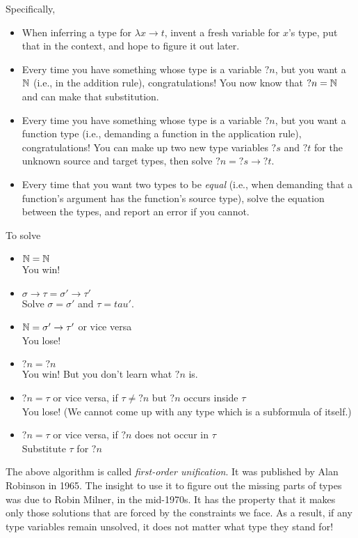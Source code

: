 \documentclass{article}
\begin{document}
Specifically,
\begin{itemize}
\item When inferring a type for $\lambda x\to t$, invent a fresh
  variable for $x$'s type, put that in the context, and hope to
  figure it out later.
\item Every time you have something whose type is a variable $?n$,
  but you want a $\mathbb{N}$ (i.e., in the addition rule), congratulations! You now know that
  $?n=\mathbb{N}$ and can make that substitution.
\item Every time you have something whose type is a variable $?n$,
  but you want a function type (i.e., demanding a function in the application rule), congratulations! You can make up
  two new type variables $?s$ and $?t$ for the unknown source and target
  types, then solve $?n=?s\to?t$.
\item Every time that you want two types to be \emph{equal} (i.e., when demanding
  that a function's argument has the function's source type), solve the
  equation between the types, and report an error if you cannot.
\end{itemize}

To solve
\begin{itemize}
\item $\mathbb{N} = \mathbb{N}$ \\ You win!
\item $\sigma\to\tau = \sigma'\to\tau'$ \\
  Solve $\sigma = \sigma'$ and $\tau = tau'$.
\item $\mathbb{N} = \sigma'\to\tau'$ or vice versa \\ You lose!
\item $?n = ?n$ \\ You win! But you don't learn what $?n$ is.
\item $?n = \tau$ or vice versa, if $\tau\neq?n$ but $?n$ occurs inside $\tau$ \\
  You lose! (We cannot come up with any type which is a subformula of itself.)
\item $?n = \tau$ or vice versa, if $?n$ does not occur in $\tau$ \\
  Substitute $\tau$ for $?n$
\end{itemize}

The above algorithm is called \emph{first-order unification}. It was published by Alan
Robinson in 1965. The insight to use it to figure out the missing parts of types was
due to Robin Milner, in the mid-1970s. It has the property that it makes only those
solutions that are forced by the constraints we face. As a result, if any type
variables remain unsolved, it does not matter what type they stand for!
\end{document}
